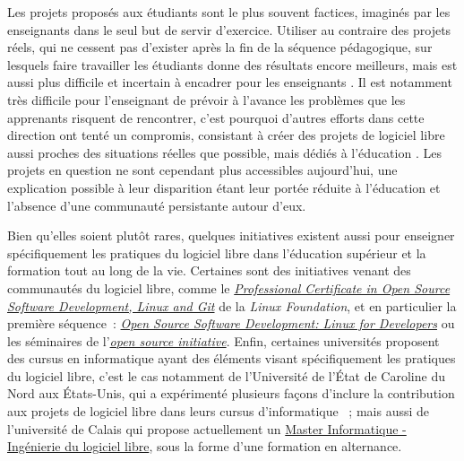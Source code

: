 \documentclass[dvipsnames]{llncs}
\newcommand{\en}[1]{\foreignlanguage{english}{\emph{#1}}}
\begin{document}
    Les projets proposés aux étudiants sont le plus souvent factices, imaginés par les enseignants dans le
    seul but de servir d'exercice. Utiliser au contraire des projets réels, qui ne cessent pas d'exister après
    la fin de la séquence pédagogique, sur lesquels faire travailler les étudiants donne des résultats encore
    meilleurs, mais est aussi plus difficile et incertain à encadrer pour les enseignants \cite{real-pbl-2010,
    real-pbl-2004}. Il est notamment très difficile pour l'enseignant de prévoir à l'avance les problèmes que
    les apprenants risquent de rencontrer, c'est pourquoi d'autres efforts dans cette direction ont tenté un
    compromis, consistant à créer des projets de logiciel libre aussi proches des situations réelles que
    possible, mais dédiés à l'éducation \cite{oss-edu-2008}. Les projets en question ne sont cependant plus
    accessibles aujourd'hui, une explication possible à leur disparition étant leur portée réduite à
    l'éducation et l'absence d'une communauté persistante autour d'eux.

    Bien qu'elles soient plutôt rares, quelques initiatives existent aussi pour enseigner spécifiquement les
    pratiques du logiciel libre dans l'éducation supérieur et la formation tout au long de la vie. Certaines
    sont des initiatives venant des communautés du logiciel libre, comme le
    \href{https://www.edx.org/professional-certificate/linuxfoundationx-open-source-software-development-linux-and-git}{\en{Professional
    Certificate in Open Source Software Development, Linux and Git}} de la \en{Linux Foundation}, et en
    particulier la première séquence :
    \href{https://www.edx.org/course/open-source-software-development-linux-for-developers}{\en{Open Source
    Software Development: Linux for Developers}} ou les séminaires de
    l'\href{https://opensource.org/osi-open-source-education}{\en{open source initiative}}. Enfin, certaines
    universités proposent des cursus en informatique ayant des éléments visant spécifiquement les pratiques du
    logiciel libre, c'est le cas notamment de l'Université de l'État de Caroline du Nord aux États-Unis, qui a
    expérimenté plusieurs façons d'inclure la contribution aux projets de logiciel libre dans leurs cursus
    d'informatique \cite{oss-edu-2008, oss-edu-2007} ; mais aussi de l'université de Calais qui propose
    actuellement un
    \href{https://www.univ-littoral.fr/formation/offre-de-formation/masters/master-informatique-ingenierie-du-logiciel-libre/}{Master
    Informatique - Ingénierie du logiciel libre}, sous la forme d'une formation en alternance.
\end{document}
